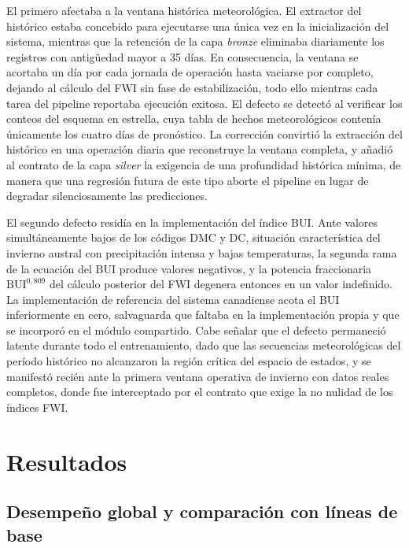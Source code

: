 \documentclass[11pt,a4paper]{article}
\begin{document}
El primero afectaba a la ventana histórica meteorológica. El extractor del
histórico estaba concebido para ejecutarse una única vez en la
inicialización del sistema, mientras que la retención de la capa
\emph{bronze} eliminaba diariamente los registros con antigüedad mayor a 35
días. En consecuencia, la ventana se acortaba un día por cada jornada de
operación hasta vaciarse por completo, dejando al cálculo del FWI sin fase
de estabilización, todo ello mientras cada tarea del pipeline reportaba
ejecución exitosa. El defecto se detectó al verificar los conteos del
esquema en estrella, cuya tabla de hechos meteorológicos contenía
únicamente los cuatro días de pronóstico. La corrección convirtió la
extracción del histórico en una operación diaria que reconstruye la ventana
completa, y añadió al contrato de la capa \emph{silver} la exigencia de una
profundidad histórica mínima, de manera que una regresión futura de este
tipo aborte el pipeline en lugar de degradar silenciosamente las
predicciones.

El segundo defecto residía en la implementación del índice BUI. Ante
valores simultáneamente bajos de los códigos DMC y DC, situación
característica del invierno austral con precipitación intensa y bajas
temperaturas, la segunda rama de la ecuación del BUI produce valores
negativos, y la potencia fraccionaria $\mathrm{BUI}^{0{,}809}$ del cálculo
posterior del FWI degenera entonces en un valor indefinido. La
implementación de referencia del sistema canadiense acota el BUI
inferiormente en cero, salvaguarda que faltaba en la implementación propia
y que se incorporó en el módulo compartido. Cabe señalar que el defecto
permaneció latente durante todo el entrenamiento, dado que las secuencias
meteorológicas del período histórico no alcanzaron la región crítica del
espacio de estados, y se manifestó recién ante la primera ventana operativa
de invierno con datos reales completos, donde fue interceptado por el
contrato que exige la no nulidad de los índices FWI.

\section{Resultados}
\label{sec:resultados}

\subsection{Desempeño global y comparación con líneas de base}
\end{document}
